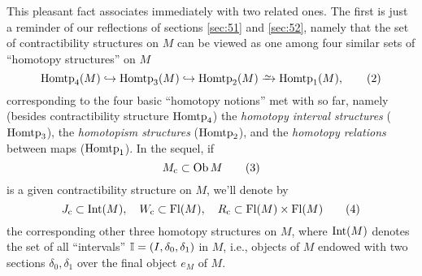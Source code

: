 This pleasant fact associates immediately with two related ones. The
first is just a reminder of our reflections of sections \ref{sec:51}
and \ref{sec:52}, namely that the set of contractibility structures on
$M$ can be viewed as one among four similar sets of ``homotopy
structures'' on $M$
\begin{equation}
  \label{eq:81.2}
  \Homtp_4(M) \hookrightarrow \Homtp_3(M) \hookrightarrow \Homtp_2(M)
  \tosim \Homtp_1(M),\tag{2}
\end{equation}
corresponding to the four basic ``homotopy notions'' met with so far,
namely (besides contractibility structure $\operatorname{Homtp}_4$) the
\emph{homotopy interval structures} ($\operatorname{Homtp}_3$), the \emph{homotopism
  structures} ($\operatorname{Homtp}_2$), and the \emph{homotopy relations} between
maps ($\operatorname{Homtp}_1$). In the sequel, if
\begin{equation}
  \label{eq:81.3}
  M_{\mathrm{c}} \subset \operatorname{Ob} M\tag{3}
\end{equation}
is a given contractibility structure on $M$, we'll denote by
\begin{equation}
  \label{eq:81.4}
  J_{\mathrm{c}} \subset \operatorname{Int}(M), \quad
  W_{\mathrm{c}} \subset \operatorname{Fl}(M), \quad
  R_{\mathrm{c}} \subset \operatorname{Fl}(M)\times\operatorname{Fl}(M)
  \tag{4}
\end{equation}
the corresponding other three homotopy structures on $M$, where
$\operatorname{Int}(M)$ denotes the set of all ``intervals''
${\mathbb{I}}=(I,\delta_0,\delta_1)$ in $M$, i.e., objects of $M$ endowed with
two sections $\delta_0,\delta_1$ over the final object $e_M$ of $M$.

